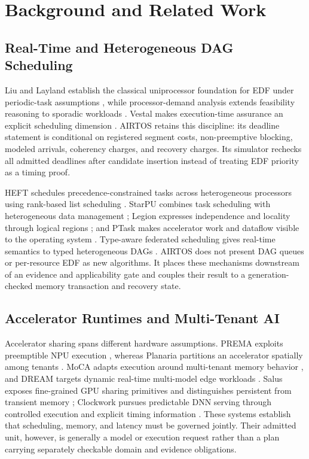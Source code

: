 \documentclass[lettersize,journal]{IEEEtran}
\begin{document}
\section{Background and Related Work}
\subsection{Real-Time and Heterogeneous DAG Scheduling}
Liu and Layland establish the classical uniprocessor foundation for EDF under
periodic-task assumptions \cite{liu1973scheduling}, while processor-demand
analysis extends feasibility reasoning to sporadic workloads
\cite{baruah1990preemptively}. Vestal makes execution-time assurance an
explicit scheduling dimension \cite{vestal2007preemptive}. AIRTOS retains this
discipline: its deadline statement is conditional on registered segment costs,
non-preemptive blocking, modeled arrivals, coherency charges, and recovery
charges. Its simulator rechecks all admitted deadlines after candidate
insertion instead of treating EDF priority as a timing proof.

HEFT schedules precedence-constrained tasks across heterogeneous processors
using rank-based list scheduling \cite{topcuoglu2002performanceeffective}.
StarPU combines task scheduling with heterogeneous data management
\cite{augonnet2011starpu}; Legion expresses independence and locality through
logical regions \cite{bauer2012legion}; and PTask makes accelerator work and
dataflow visible to the operating system \cite{rossbach2011ptask}. Type-aware
federated scheduling gives real-time semantics to typed heterogeneous DAGs
\cite{lin2022typeaware}. AIRTOS does not present DAG queues or per-resource EDF
as new algorithms. It places these mechanisms downstream of an evidence and
applicability gate and couples their result to a generation-checked memory
transaction and recovery state.

\subsection{Accelerator Runtimes and Multi-Tenant AI}
Accelerator sharing spans different hardware assumptions. PREMA exploits
preemptible NPU execution \cite{choi2020prema}, whereas Planaria partitions an
accelerator spatially among tenants \cite{ghodrati2020planaria}. MoCA adapts
execution around multi-tenant memory behavior \cite{kim2023moca}, and DREAM
targets dynamic real-time multi-model edge workloads \cite{kim2023dream}.
Salus exposes fine-grained GPU sharing primitives and distinguishes persistent
from transient memory \cite{yu2019salus}; Clockwork pursues predictable DNN
serving through controlled execution and explicit timing information
\cite{gujarati2020serving}. These systems establish that scheduling, memory,
and latency must be governed jointly. Their admitted unit, however, is
generally a model or execution request rather than a plan carrying separately
checkable domain and evidence obligations.
\end{document}
